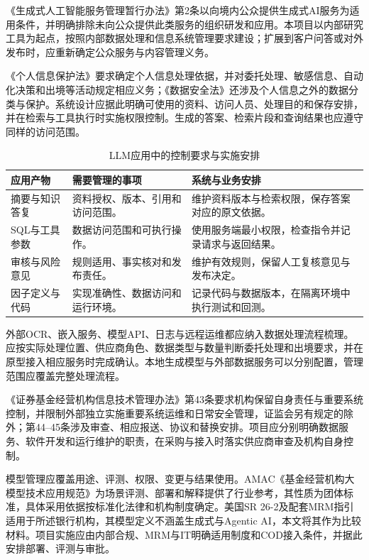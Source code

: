\documentclass[11pt,a4paper,fontset=none]{ctexart}
\begin{document}
《生成式人工智能服务管理暂行办法》第2条以向境内公众提供生成式AI服务为适用条件，并明确排除未向公众提供此类服务的组织研发和应用。本项目以内部研究工具为起点，按照内部数据处理和信息系统管理要求建设；扩展到客户问答或对外发布时，应重新确定公众服务与内容管理义务。

《个人信息保护法》要求确定个人信息处理依据，并对委托处理、敏感信息、自动化决策和出境等活动规定相应义务；《数据安全法》还涉及个人信息之外的数据分类与保护。系统设计应据此明确可使用的资料、访问人员、处理目的和保存安排，并在检索与工具执行时实施权限控制。生成的答案、检索片段和查询结果也应遵守同样的访问范围。

\begin{table}[H]\small\centering
\caption{LLM应用中的控制要求与实施安排}
\begin{tabularx}{\linewidth}{@{}P{27mm}Y Y@{}}\toprule
应用产物 & 需要管理的事项 & 系统与业务安排\\\midrule
摘要与知识答复 & 资料授权、版本、引用和访问范围。 & 维护资料版本与检索权限，保存答案对应的原文依据。\\
SQL与工具参数 & 数据访问范围和可执行操作。 & 使用服务端最小权限，检查指令并记录请求与返回结果。\\
审核与风险意见 & 规则适用、事实核对和发布责任。 & 维护有效规则，保留人工复核意见与发布决定。\\
因子定义与代码 & 实现准确性、数据访问和运行环境。 & 记录代码与数据版本，在隔离环境中执行测试和回测。\\\bottomrule
\end{tabularx}
\end{table}

外部OCR、嵌入服务、模型API、日志与远程运维都应纳入数据处理流程梳理。应按实际处理位置、供应商角色、数据类型与数量判断委托处理和出境要求，并在原型接入相应服务时完成确认。本地生成模型与外部数据服务可以分别配置，管理范围应覆盖完整处理流程。

《证券基金经营机构信息技术管理办法》第43条要求机构保留自身责任与重要系统控制，并限制外部独立实施重要系统运维和日常安全管理，证监会另有规定的除外；第44--45条涉及审查、相应报送、协议和替换安排。项目应分别明确数据服务、软件开发和运行维护的职责，在采购与接入时落实供应商审查及机构自身控制。

模型管理应覆盖用途、评测、权限、变更与结果使用。AMAC《基金经营机构大模型技术应用规范》为场景评测、部署和解释提供了行业参考，其性质为团体标准，具体采用依据按标准化法律和机构制度确定。美国SR 26-2及配套MRM指引适用于所述银行机构，其模型定义不涵盖生成式与Agentic AI，本文将其作为比较材料。项目实施应由内部合规、MRM与IT明确适用制度和COD接入条件，并据此安排部署、评测与审批。
\end{document}
